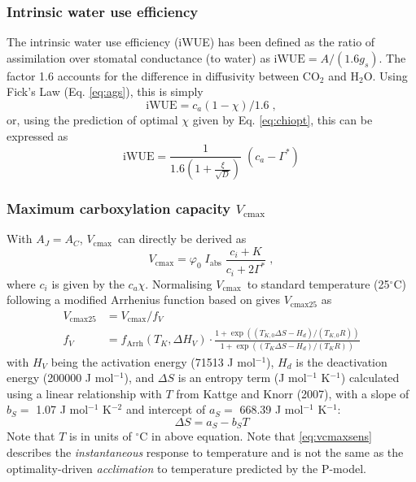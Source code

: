 \documentclass{myreport}
\newcommand{\vcmax}{$V_{\text{cmax}}$}
\begin{document}

\subsubsection{Intrinsic water use efficiency}
The intrinsic water use efficiency (iWUE) has been defined as the ratio of assimilation over stomatal conductance (to water) \citep{beer09gbc} as $\text{iWUE} = A / (1.6 g_s)$. The factor 1.6 accounts for the difference in diffusivity between CO$_2$ and H$_2$O. Using Fick's Law (Eq. \ref{eq:ags}), this is simply
\begin{equation}
    \mathrm{iWUE} = c_a (1-\chi)/1.6 \;,
\end{equation}
or, using the prediction of optimal $\chi$ given by Eq. \ref{eq:chiopt}, this can be expressed as
\begin{equation}
    \text{iWUE} = \frac{1}{1.6 \left( 1+ \frac{\xi}{\sqrt{D}} \right) }\; (c_a - \Gamma^\ast)
\end{equation}

\subsubsection{Maximum carboxylation capacity
\label{sec:vcmax}
$V_{\mathrm{cmax}}$}
With $A_J=A_C$, \vcmax\ can directly be derived as 
\begin{equation}
    \label{eq:vcmax}
    V_{\mathrm{cmax}} = \varphi_0\;I_{\mathrm{abs}}\;\frac{c_i + K}{c_i + 2\Gamma^\ast} \;,
\end{equation}
where $c_i$ is given by the $c_a \chi$. Normalising \vcmax\ to standard temperature (25$^{\circ}$C) following a modified Arrhenius function based on \cite{kattge07} gives $V_{\mathrm{cmax25}}$ as
\begin{align}
    V_{\mathrm{cmax25}} &= V_{\mathrm{cmax}} / f_V \\ 
    \label{eq:vcmaxsens}
    f_V &= f_{\text{Arrh}}(T_K, \Delta H_V) \cdot \frac{1+\exp( (T_{K,0}\Delta S-H_d) / (T_{K,0} R) )}{1+\exp( (T_K\Delta S - H_d)/(T_K R) )}
\end{align}
with $H_V$ being the activation energy (71513 J mol$^{-1}$), $H_d$ is the deactivation energy (200000 J mol$^{-1}$), and $\Delta S$ is an entropy term (J mol$^{-1}$ K$^{-1}$) calculated using a linear relationship with $T$ from Kattge and Knorr (2007), with a slope of $b_S =$ 1.07 J mol$^{-1}$ K$^{-2}$ and intercept of $a_S = $ 668.39 J mol$^{-1}$ K$^{-1}$:
\begin{equation}
    \Delta S = a_S - b_S T
\end{equation}
Note that $T$ is in units of $^{\circ}$C in above equation. Note that \ref{eq:vcmaxsens} describes the \textit{instantaneous} response to temperature and is not the same as the optimality-driven \textit{acclimation} to temperature predicted by the P-model.
\end{document}
